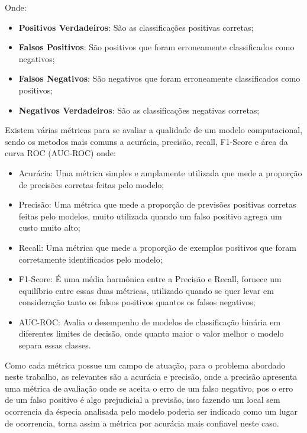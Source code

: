 \documentclass[
    12pt,               %
    openright,          %
    oneside,            %
    a4paper,            %
    english,            %
    brazil              %
    ]{abntex2}
\begin{document}
Onde:
\begin{itemize}
    \item \textbf{Positivos Verdadeiros}: São as classificações positivas corretas;
    \item \textbf{Falsos Positivos}: São positivos que foram erroneamente classificados como negativos;
    \item \textbf{Falsos Negativos}: São negativos que foram erroneamente classificados como positivos;
    \item \textbf{Negativos Verdadeiros}: São as classificações negativas corretas;
\end{itemize}

Existem várias métricas para se avaliar a qualidade de um modelo computacional, sendo os metodos mais
comuns a acurácia, precisão, recall, F1-Score e área da curva ROC (AUC-ROC) \cite{metricas_aval_modelo} onde:

\begin{itemize}
    \item Acurácia: Uma métrica simples e amplamente utilizada que mede a proporção de precisões corretas feitas pelo modelo;
    \item Precisão: Uma métrica que mede a proporção de previsões positivas corretas feitas pelo modelos, muito utilizada 
    quando um falso positivo agrega um custo muito alto;
    \item Recall: Uma métrica que mede a proporção de exemplos positivos que foram corretamente identificados pelo modelo;
    \item F1-Score: É uma média harmônica entre a Precisão e Recall, fornece um equilíbrio entre essas duas métricas, utilizado
    quando se quer levar em consideração tanto os falsos positivos quantos os falsos negativos;
    \item AUC-ROC: Avalia o desempenho de modelos de classificação binária em diferentes limites de decisão, onde quanto
    maior o valor melhor o modelo separa essas classes.
\end{itemize}

Como cada métrica possue um campo de atuação, para o problema abordado neste trabalho, as relevantes são a acurácia e precisão,
onde a precisão apresenta uma métrica de avaliação onde se aceita o erro de um falso negativo, pos o erro de um falso positivo
é algo prejudicial a previsão, isso fazendo um local sem ocorrencia da éspecia analisada pelo modelo poderia ser indicado como 
um lugar de ocorrencia, torna assim a métrica por acurácia mais confiavel neste caso.
\end{document}
